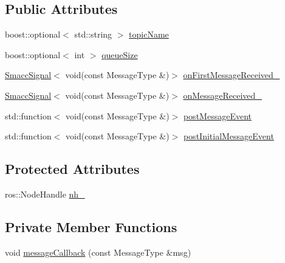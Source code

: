 \subsection*{Public Attributes}
\begin{DoxyCompactItemize}
\item 
boost\+::optional$<$ std\+::string $>$ \hyperlink{classsmacc_1_1client__bases_1_1SmaccSubscriberClient_aeadf21a09412c6c9488e5acd50fb4f40}{topic\+Name}
\item 
boost\+::optional$<$ int $>$ \hyperlink{classsmacc_1_1client__bases_1_1SmaccSubscriberClient_a67f03f081d83476cdb7fd631b6aba450}{queue\+Size}
\item 
\hyperlink{classsmacc_1_1SmaccSignal}{Smacc\+Signal}$<$ void(const Message\+Type \&)$>$ \hyperlink{classsmacc_1_1client__bases_1_1SmaccSubscriberClient_aeb31fdb287bb54c4d9b7dffff416a857}{on\+First\+Message\+Received\+\_\+}
\item 
\hyperlink{classsmacc_1_1SmaccSignal}{Smacc\+Signal}$<$ void(const Message\+Type \&)$>$ \hyperlink{classsmacc_1_1client__bases_1_1SmaccSubscriberClient_aa1c39106c9250632bfb5a22137601026}{on\+Message\+Received\+\_\+}
\item 
std\+::function$<$ void(const Message\+Type \&)$>$ \hyperlink{classsmacc_1_1client__bases_1_1SmaccSubscriberClient_ad71ae0708e8a3ea321de985076d8b0ac}{post\+Message\+Event}
\item 
std\+::function$<$ void(const Message\+Type \&)$>$ \hyperlink{classsmacc_1_1client__bases_1_1SmaccSubscriberClient_ac184f4c0a6e924ceb9eecc71d6252106}{post\+Initial\+Message\+Event}
\end{DoxyCompactItemize}
\subsection*{Protected Attributes}
\begin{DoxyCompactItemize}
\item 
ros\+::\+Node\+Handle \hyperlink{classsmacc_1_1client__bases_1_1SmaccSubscriberClient_a401d2476e89e27acc2e905acd701f053}{nh\+\_\+}
\end{DoxyCompactItemize}
\subsection*{Private Member Functions}
\begin{DoxyCompactItemize}
\item 
void \hyperlink{classsmacc_1_1client__bases_1_1SmaccSubscriberClient_acf85b80439aff5cf2bfa0649e9e45654}{message\+Callback} (const Message\+Type \&msg)
\end{DoxyCompactItemize}
